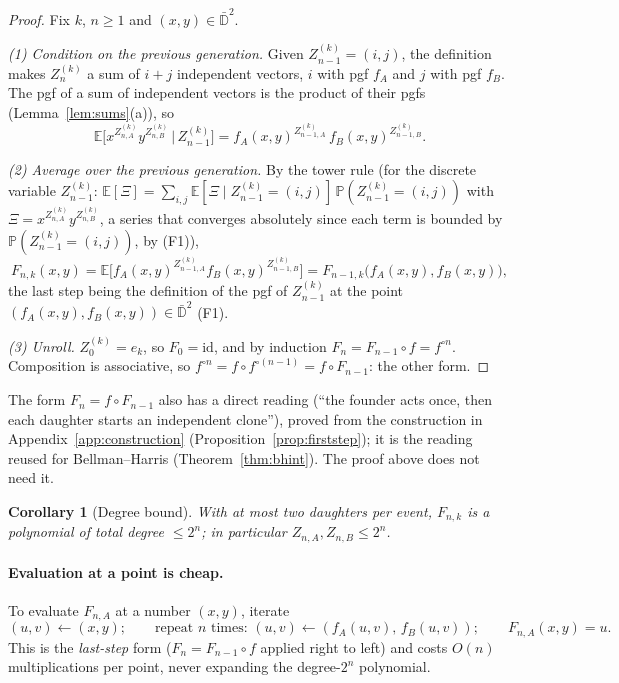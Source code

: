 \documentclass[11pt]{article}
\newtheorem{corollary}[theorem]{Corollary}
\theoremstyle{definition}
\theoremstyle{remark}
\newcommand{\E}{\mathbb{E}}
\newcommand{\Prob}{\mathbb{P}}
\begin{document}
\begin{proof}
Fix $k$, $n\ge1$ and $(x,y)\in\bar{\mathbb D}^2$.

\emph{(1) Condition on the previous generation.} Given $Z^{(k)}_{n-1}=(i,j)$, the definition makes $Z^{(k)}_n$ a sum of $i+j$ independent vectors, $i$ with pgf $f_A$ and $j$ with pgf $f_B$. The pgf of a sum of independent vectors is the product of their pgfs (Lemma~\ref{lem:sums}(a)), so
\[
\E\big[x^{Z^{(k)}_{n,A}}y^{Z^{(k)}_{n,B}}\,\big|\,Z^{(k)}_{n-1}\big]=f_A(x,y)^{Z^{(k)}_{n-1,A}}\,f_B(x,y)^{Z^{(k)}_{n-1,B}} .
\]

\emph{(2) Average over the previous generation.} By the tower rule (for the discrete variable $Z^{(k)}_{n-1}$: $\E[\Xi]=\sum_{i,j}\E[\Xi\mid Z^{(k)}_{n-1}=(i,j)]\,\Prob(Z^{(k)}_{n-1}=(i,j))$ with $\Xi=x^{Z^{(k)}_{n,A}}y^{Z^{(k)}_{n,B}}$, a series that converges absolutely since each term is bounded by $\Prob(Z^{(k)}_{n-1}=(i,j))$, by (F1)),
\[
F_{n,k}(x,y)=\E\Big[f_A(x,y)^{Z^{(k)}_{n-1,A}}f_B(x,y)^{Z^{(k)}_{n-1,B}}\Big]=F_{n-1,k}\big(f_A(x,y),f_B(x,y)\big),
\]
the last step being the definition of the pgf of $Z^{(k)}_{n-1}$ at the point $(f_A(x,y),f_B(x,y))\in\bar{\mathbb D}^2$ (F1).

\emph{(3) Unroll.} $Z^{(k)}_0=e_k$, so $F_0=\mathrm{id}$, and by induction $F_n=F_{n-1}\circ f=f^{\circ n}$. Composition is associative, so $f^{\circ n}=f\circ f^{\circ(n-1)}=f\circ F_{n-1}$: the other form.
\end{proof}
\noindent The form $F_n=f\circ F_{n-1}$ also has a direct reading (``the founder acts once, then each daughter starts an independent clone''), proved from the construction in Appendix~\ref{app:construction} (Proposition~\ref{prop:firststep}); it is the reading reused for Bellman--Harris (Theorem~\ref{thm:bhint}). The proof above does not need it.


\begin{corollary}[Degree bound]\label{cor:degree}
With at most two daughters per event, $F_{n,k}$ is a polynomial of total degree $\le2^n$; in particular $Z_{n,A},Z_{n,B}\le2^n$.
\end{corollary}

\paragraph{Evaluation at a point is cheap.} To evaluate $F_{n,A}$ at a number $(x,y)$, iterate
\[
(u,v)\leftarrow(x,y);\qquad\text{repeat }n\text{ times: }(u,v)\leftarrow(f_A(u,v),\,f_B(u,v));\qquad F_{n,A}(x,y)=u.
\]
This is the \emph{last-step} form ($F_n=F_{n-1}\circ f$ applied right to left) and costs $O(n)$ multiplications per point, never expanding the degree-$2^n$ polynomial.
\end{document}
